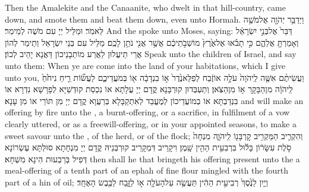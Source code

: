 {Then the Amalekite and the Canaanite, who dwelt in that hill-country, came down, and smote them and beat them down, even unto Hormah.}{}
\newperek
{}
{וַיְדַבֵּ֥ר יְהֹוָ֖ה אֶל\maqqaf מֹשֶׁ֥ה לֵּאמֹֽר׃}
{וּמַלֵּיל יְיָ עִם מֹשֶׁה לְמֵימַר׃}
{And the \lord\space spoke unto Moses, saying:}{}
{דַּבֵּר֙ אֶל\maqqaf בְּנֵ֣י יִשְׂרָאֵ֔ל וְאָמַרְתָּ֖ אֲלֵהֶ֑ם כִּ֣י תָבֹ֗אוּ אֶל\maqqaf אֶ֙רֶץ֙ מוֹשְׁבֹ֣תֵיכֶ֔ם אֲשֶׁ֥ר אֲנִ֖י נֹתֵ֥ן לָכֶֽם׃}
{מַלֵּיל עִם בְּנֵי יִשְׂרָאֵל וְתֵימַר לְהוֹן אֲרֵי תֵיעֲלוּן לַאֲרַע מוֹתְבָנֵיכוֹן דַּאֲנָא יָהֵיב לְכוֹן׃}
{Speak unto the children of Israel, and say unto them: When ye are come into the land of your habitations, which I give unto you,}{}
{וַעֲשִׂיתֶ֨ם אִשֶּׁ֤ה לַֽיהֹוָה֙ עֹלָ֣ה אוֹ\maqqaf זֶ֔בַח לְפַלֵּא\maqqaf נֶ֙דֶר֙ א֣וֹ בִנְדָבָ֔ה א֖וֹ בְּמֹעֲדֵיכֶ֑ם לַעֲשׂ֞וֹת רֵ֤יחַ נִיחֹ֙חַ֙ לַֽיהֹוָ֔ה מִן\maqqaf הַבָּקָ֖ר א֥וֹ מִן\maqqaf הַצֹּֽאן׃}
{וְתַעְבְּדוּן קוּרְבָּנָא קֳדָם יְיָ עֲלָתָא אוֹ נִכְסַת קוּדְשַׁיָּא לְפָרָשָׁא נִדְרָא אוֹ בִנְדַבְתָּא אוֹ בְמוֹעֲדֵיכוֹן לְמֶעֱבַד לְאִתְקַבָּלָא בְּרַעֲוָא קֳדָם יְיָ מִן תּוֹרֵי אוֹ מִן עָנָא׃}
{and will make an offering by fire unto the \lord, a burnt-offering, or a sacrifice, in fulfilment of a vow clearly uttered, or as a freewill-offering, or in your appointed seasons, to make a sweet savour unto the \lord, of the herd, or of the flock;}{}
{וְהִקְרִ֛יב הַמַּקְרִ֥יב קׇרְבָּנ֖וֹ לַֽיהֹוָ֑ה מִנְחָה֙ סֹ֣לֶת עִשָּׂר֔וֹן בָּל֕וּל בִּרְבִעִ֥ית הַהִ֖ין שָֽׁמֶן׃}
{וִיקָרֵיב דִּמְקָרֵיב קוּרְבְּנֵיהּ קֳדָם יְיָ מִנְחָתָא סוּלְתָּא עֶשְׂרוֹנָא דְּפִיל בְּרַבְעוּת הִינָא מִשְׁחָא׃}
{then shall he that bringeth his offering present unto the \lord\space a meal-offering of a tenth part of an ephah of fine flour mingled with the fourth part of a hin of oil;}{}
{וְיַ֤יִן לַנֶּ֙סֶךְ֙ רְבִיעִ֣ית הַהִ֔ין תַּעֲשֶׂ֥ה עַל\maqqaf הָעֹלָ֖ה א֣וֹ לַזָּ֑בַח לַכֶּ֖בֶשׂ הָאֶחָֽד׃}
